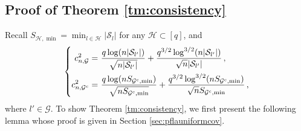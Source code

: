 \documentclass[12pt]{article}
\newcommand{\bTheta}{\boldsymbol \Theta}
\newcommand{\btheta}{\boldsymbol \theta}
\newcommand{\btc}{{\rm c}}
\newcommand{\0}{{\bf 0}}
\begin{document}


\subsection{Proof of Theorem \ref{tm:consistency}} \label{pr:tm:consistency}
Recall $S_{\mathcal{H},\min}=\min_{l\in\mathcal{H}}|\mathcal{S}_l|$ for any $\mathcal{H}\subset[q]$, and \begin{align*}
\left\{\begin{aligned}
   c_{n,\mathcal{G}}^2=&~\frac{q\log(n|\mathcal{S}_{l'}|)}{\sqrt{n|\mathcal{S}_{l'}|}}+\frac{q^{3/2}\log^{3/2}(n|\mathcal{S}_{l'}|)}{\sqrt{n}|\mathcal{S}_{l'}|}\,, \\
   c_{n,\mathcal{G}^{\btc}}^2=&~\frac{q\log(nS_{\mathcal{G}^{\btc},\min})}{\sqrt{nS_{\mathcal{G}^{\btc},\min}}}+\frac{q^{3/2}\log^{3/2}(nS_{\mathcal{G}^{\btc},\min})}{\sqrt{n}S_{\mathcal{G}^{\btc},\min}}\,,
\end{aligned}\right.
\end{align*}
where $l'\in\mathcal{G}$. 
To show Theorem \ref{tm:consistency}, we first present the following lemma whose proof is given in Section \ref{sec:pflauniformcov}. 
\end{document}
